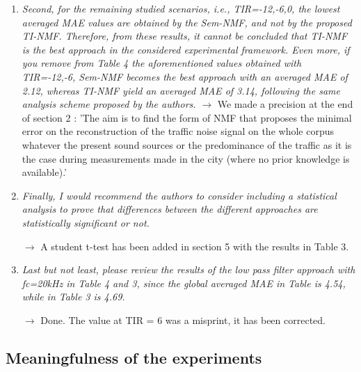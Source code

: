 \documentclass[10pt]{article}
\begin{document}
\begin{enumerate}
\item \emph{Second, for the remaining studied scenarios, i.e., TIR={-12,-6,0}, the lowest averaged MAE values are obtained by the Sem-NMF, and not by the proposed TI-NMF.
Therefore, from these results, it cannot be concluded that TI-NMF is the best approach in the considered experimental framework. Even more, if you remove from Table 4 the aforementioned values obtained with TIR={-12,-6}, Sem-NMF becomes the best approach with an averaged MAE of 2.12, whereas TI-NMF yield an averaged MAE of 3.14, following the same analysis scheme proposed by the authors.}
$\rightarrow$ We made a precision at the end of section 2 : 'The aim is to find the form of NMF that proposes the minimal error on the reconstruction of the traffic noise signal on the whole corpus whatever the present sound sources or the predominance of the traffic as it is the case during measurements made in the city (where no prior knowledge is available).'

\item \emph{Finally, I would recommend the authors to consider including a statistical analysis to prove that differences between the different approaches are statistically significant or not.}

$\rightarrow$ A student t-test has been added in section 5 with the results in Table 3.

\item \emph{Last but not least, please review the results of the low pass filter approach with fc=20kHz in Table 4 and 3, since the global averaged MAE in Table is 4.54, while in Table 3 is 4.69.}

$\rightarrow$ Done. The value at TIR = 6 was a misprint, it has been corrected.


\end{enumerate}

\subsection{Meaningfulness of the experiments}
\end{document}

